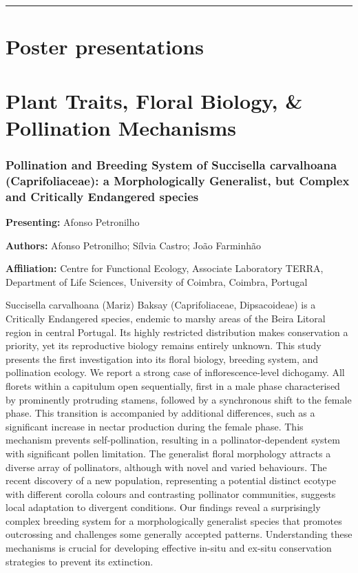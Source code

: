 \documentclass[
  letterpaper,
  DIV=11,
  numbers=noendperiod]{scrartcl}
\begin{document}
\begin{center}\rule{0.5\linewidth}{0.5pt}\end{center}

\newpage

\section{Poster presentations}\label{poster-presentations}

\section{Plant Traits, Floral Biology, \& Pollination
Mechanisms}\label{plant-traits-floral-biology-pollination-mechanisms}

\subsubsection{Pollination and Breeding System of Succisella carvalhoana
(Caprifoliaceae): a Morphologically Generalist, but Complex and
Critically Endangered
species}\label{pollination-and-breeding-system-of-succisella-carvalhoana-caprifoliaceae-a-morphologically-generalist-but-complex-and-critically-endangered-species}

\textbf{Presenting:} Afonso Petronilho

\textbf{Authors:} Afonso Petronilho; Sílvia Castro; João Farminhão

\textbf{Affiliation:} Centre for Functional Ecology, Associate
Laboratory TERRA, Department of Life Sciences, University of Coimbra,
Coimbra, Portugal

Succisella carvalhoana (Mariz) Baksay (Caprifoliaceae, Dipsacoideae) is
a Critically Endangered species, endemic to marshy areas of the Beira
Litoral region in central Portugal. Its highly restricted distribution
makes conservation a priority, yet its reproductive biology remains
entirely unknown. This study presents the first investigation into its
floral biology, breeding system, and pollination ecology. We report a
strong case of inflorescence-level dichogamy. All florets within a
capitulum open sequentially, first in a male phase characterised by
prominently protruding stamens, followed by a synchronous shift to the
female phase. This transition is accompanied by additional differences,
such as a significant increase in nectar production during the female
phase. This mechanism prevents self-pollination, resulting in a
pollinator-dependent system with significant pollen limitation. The
generalist floral morphology attracts a diverse array of pollinators,
although with novel and varied behaviours. The recent discovery of a new
population, representing a potential distinct ecotype with different
corolla colours and contrasting pollinator communities, suggests local
adaptation to divergent conditions. Our findings reveal a surprisingly
complex breeding system for a morphologically generalist species that
promotes outcrossing and challenges some generally accepted patterns.
Understanding these mechanisms is crucial for developing effective
in-situ and ex-situ conservation strategies to prevent its extinction.
\end{document}
